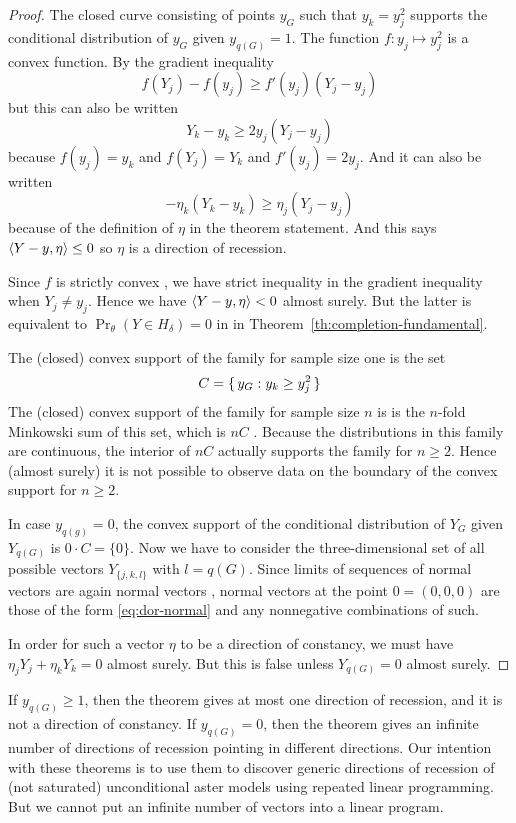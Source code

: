 \begin{proof}
The closed curve consisting of points $y_G$ such that $y_k = y_j^2$
supports the conditional distribution of $y_G$ given $y_{q(G)} = 1$.
The function $f : y_j \mapsto y_j^2$ is a convex function.
By the gradient inequality \citep[Theorem~2.13 (b)]{rockafellar-wets}
$$
   f(Y_j) - f(y_j) \ge f'(y_j) (Y_j - y_j)
$$
but this can also be written
$$
   Y_k - y_k \ge 2 y_j (Y_j - y_j)
$$
because $f(y_j) = y_k$ and $f(Y_j) = Y_k$ and $f'(y_j) = 2 y_j$.
And it can also be written
$$
   - \eta_k (Y_k - y_k) \ge \eta_j (Y_j - y_j)
$$
because of the definition of $\eta$ in the theorem statement.
And this says $\langle Y - y, \eta \rangle \le 0$ so $\eta$ is a direction of
recession.

Since $f$ is strictly convex
\citep[Theorem~2.13 ($\text{a}'$)]{rockafellar-wets},
we have strict inequality in the gradient inequality
\citep[Theorem~2.13 ($\text{b}'$)]{rockafellar-wets} when $Y_j \neq y_j$.
Hence we have \hbox{$\langle Y - y, \eta \rangle < 0$} almost surely.
But the latter is equivalent to $\Pr_\theta(Y \in H_\delta) = 0$ in
in Theorem~\ref{th:completion-fundamental}.

The (closed) convex support of the family for sample size one is
the set
$$
   C = \{\,  y_G : y_k \ge y_j^2  \,\}
$$
The (closed) convex support of the family for sample size $n$ is
is the $n$-fold Minkowski sum of this set, which is $n C$
\citep[Proposition~2.23]{rockafellar-wets}.  Because the distributions
in this family are continuous, the interior of $n C$ actually supports
the family for $n \ge 2$.  Hence (almost surely) it is not possible
to observe data on the boundary of the convex support for $n \ge 2$.

In case $y_{q(g)} = 0$, the convex support of the conditional distribution
of $Y_G$ given $Y_{q(G)}$ is $0 \cdot C = \{ 0 \}$.
Now we have to consider the three-dimensional set of all possible vectors
$Y_{\{j, k, l\}}$ with $l = q(G)$.  Since limits of sequences of normal vectors
are again normal vectors
\citep[Proposition~6.6 and Theorem~6.9]{rockafellar-wets},
normal vectors at the point $0 = (0, 0, 0)$ are those of the form
\eqref{eq:dor-normal} and any nonnegative combinations of such.

In order for such a vector $\eta$ to be a direction of constancy,
we must have $\eta_j Y_j + \eta_k Y_k = 0$ almost surely.
But this is false unless $Y_{q(G)} = 0$ almost surely.
\end{proof}

If $y_{q(G)} \ge 1$, then the theorem gives at most one direction of recession,
and it is not a direction of constancy.
If $y_{q(G)} = 0$, then the theorem gives an infinite number of directions
of recession pointing in different directions.
Our intention with these theorems is to use them to discover generic
directions of recession of (not saturated) unconditional aster models
using repeated linear programming.  But we cannot put an infinite number
of vectors into a linear program.

